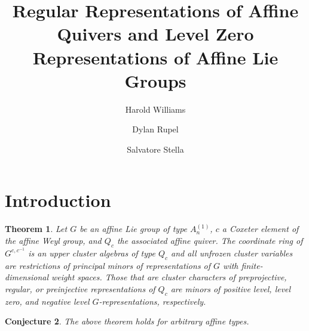 \documentclass[11pt]{amsart}
\begin{document}
\title{Regular Representations of Affine Quivers and Level Zero Representations of Affine Lie Groups}

\newtheorem{theorem}{Theorem}[section]
\newtheorem{conjecture}[theorem]{Conjecture}
\newtheorem{corollary}[theorem]{Corollary}
\newtheorem{definition}[theorem]{Definition}
\newtheorem{lemma}[theorem]{Lemma}
\newtheorem{proposition}[theorem]{Proposition}
\newtheorem{example}[theorem]{Example}
\newtheorem{remark}[theorem]{Remark}

\author{Harold Williams}
\address{Harold Williams\newline
University of Texas at Austin\newline
Department of Mathematics\newline
Austin TX 78712\newline
USA}

\author[Rupel]{Dylan Rupel}
\address[Dylan Rupel]{University of Notre Dame}

\author[Stella]{Salvatore Stella}
\address[Salvatore Stella]{Universit\`a degli studi di Roma ``La Sapienza''}

\begin{abstract}
\end{abstract}

\maketitle

\section{Introduction}

\begin{theorem}\label{thm:maintheorem}
Let $G$ be an affine Lie group of type $A_n^{(1)}$, $c$ a Coxeter element of the affine Weyl group, and $Q_c$ the associated affine quiver.  The coordinate ring of $G^{c,c^{-1}}$ is an upper cluster algebras of type $Q_c$ and all unfrozen cluster variables are restrictions of principal minors of representations of $G$ with finite-dimensional weight spaces.  Those that are cluster characters of preprojective, regular, or preinjective representations of $Q_c$ are minors of positive level, level zero, and negative level $G$-representations, respectively.
\end{theorem}

\begin{conjecture}\label{conj:mainconjecture}
The above theorem holds for arbitrary affine types.
\end{conjecture}
\end{document}
